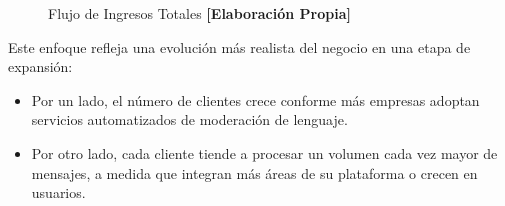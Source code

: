 \begin{figure}[h!]
    \centering
    \caption{Flujo de Ingresos Totales \textbf{[Elaboración Propia]}}
\end{figure}

Este enfoque refleja una evolución más realista del negocio en una etapa de expansión:

\begin{itemize}
    \item Por un lado, el número de clientes crece conforme más empresas adoptan servicios automatizados de moderación de lenguaje.
    \item Por otro lado, cada cliente tiende a procesar un volumen cada vez mayor de mensajes, a medida que integran más áreas de su plataforma o crecen en usuarios.
\end{itemize}






